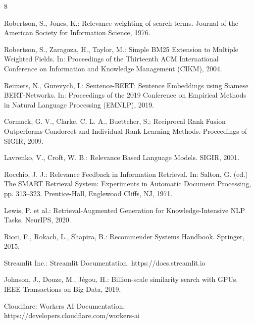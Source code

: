 \documentclass[runningheads]{llncs}
\begin{document}
\begin{thebibliography}{8}

Robertson, S., Jones, K.:
Relevance weighting of search terms.
Journal of the American Society for Information Science, 1976.

Robertson, S., Zaragoza, H., Taylor, M.:
Simple BM25 Extension to Multiple Weighted Fields.
In: Proceedings of the Thirteenth ACM International Conference on Information and Knowledge Management (CIKM), 2004.

Reimers, N., Gurevych, I.:
Sentence-BERT: Sentence Embeddings using Siamese BERT-Networks.
In: Proceedings of the 2019 Conference on Empirical Methods in Natural Language Processing (EMNLP), 2019.

Cormack, G. V., Clarke, C. L. A., Buettcher, S.:
Reciprocal Rank Fusion Outperforms Condorcet and Individual Rank Learning Methods.
Proceedings of SIGIR, 2009.

Lavrenko, V., Croft, W. B.:
Relevance Based Language Models.
SIGIR, 2001.

Rocchio, J. J.:
Relevance Feedback in Information Retrieval.
In: Salton, G. (ed.) The SMART Retrieval System: Experiments in Automatic Document Processing,
pp. 313--323. Prentice-Hall, Englewood Cliffs, NJ, 1971.

Lewis, P. et al.:
Retrieval-Augmented Generation for Knowledge-Intensive NLP Tasks.
NeurIPS, 2020.

Ricci, F., Rokach, L., Shapira, B.:
Recommender Systems Handbook.
Springer, 2015.

Streamlit Inc.:
Streamlit Documentation.
https://docs.streamlit.io

Johnson, J., Douze, M., Jégou, H.:
Billion-scale similarity search with GPUs.
IEEE Transactions on Big Data, 2019.

Cloudflare:
Workers AI Documentation.
https://developers.cloudflare.com/workers-ai

\end{thebibliography}
\end{document}
